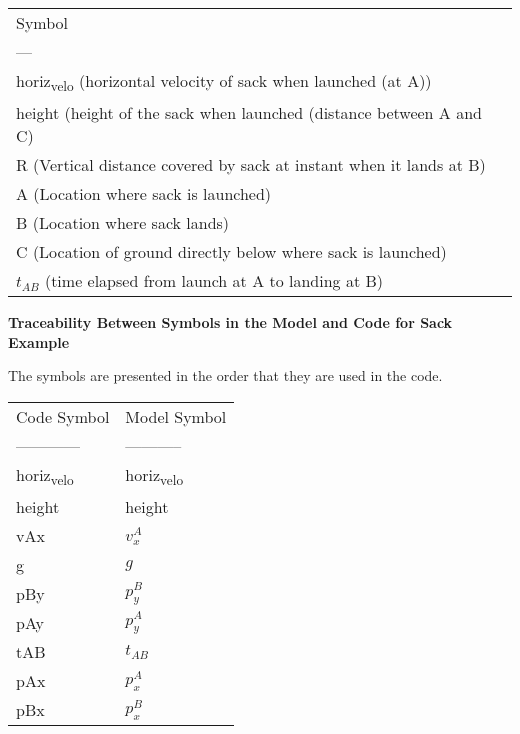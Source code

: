 \documentclass[11pt]{article}
\begin{document}
\begin{center}
\begin{tabular}{l}
Symbol\\
---\\
horiz\textsubscript{velo} (horizontal velocity of sack when launched (at A))\\
height (height of the sack when launched (distance between A and C)\\
R (Vertical distance covered by sack at instant when it lands at B)\\
A (Location where sack is launched)\\
B (Location where sack lands)\\
C (Location of ground directly below where sack is launched)\\
\(t_{AB}\) (time elapsed from launch at A to landing at B)\\
\end{tabular}
\end{center}

\textbf{Traceability Between Symbols in the Model and Code for Sack Example}

The symbols are presented in the order that they are used in the code.

\begin{center}
\begin{tabular}{ll}
Code Symbol & Model Symbol\\
------------ & -----------\\
horiz\textsubscript{velo} & horiz\textsubscript{velo}\\
height & height\\
vAx & \(v^A_x\)\\
g & \(g\)\\
pBy & \(p^B_y\)\\
pAy & \(p^A_y\)\\
tAB & \(t_{AB}\)\\
pAx & \(p^A_x\)\\
pBx & \(p^B_x\)\\
\end{tabular}
\end{center}
\end{document}
